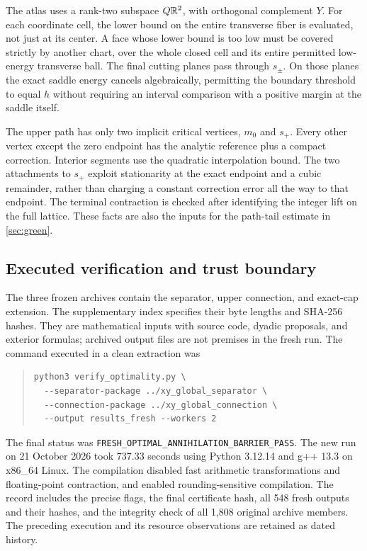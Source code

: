 The atlas uses a rank-two subspace $Q\mathbb R^2$, with orthogonal complement $Y$. For each coordinate cell, the lower bound on the entire transverse fiber is evaluated, not just at its center. A face whose lower bound is too low must be covered strictly by another chart, over the whole closed cell and its entire permitted low-energy transverse ball. The final cutting planes pass through $s_\pm$. On those planes the exact saddle energy cancels algebraically, permitting the boundary threshold to equal $h$ without requiring an interval comparison with a positive margin at the saddle itself.

The upper path has only two implicit critical vertices, $m_0$ and $s_+$. Every other vertex except the zero endpoint has the analytic reference plus a compact correction. Interior segments use the quadratic interpolation bound. The two attachments to $s_+$ exploit stationarity at the exact endpoint and a cubic remainder, rather than charging a constant correction error all the way to that endpoint. The terminal contraction is checked after identifying the integer lift on the full lattice. These facts are also the inputs for the path-tail estimate in \cref{sec:green}.

\subsection{Executed verification and trust boundary}

The three frozen archives contain the separator, upper connection, and exact-cap extension. The supplementary index specifies their byte lengths and SHA-256 hashes. They are mathematical inputs with source code, dyadic proposals, and exterior formulas; archived output files are not premises in the fresh run. The command executed in a clean extraction was
\begin{quote}\small
\begin{verbatim}
python3 verify_optimality.py \
  --separator-package ../xy_global_separator \
  --connection-package ../xy_global_connection \
  --output results_fresh --workers 2
\end{verbatim}
\end{quote}
The final status was \texttt{FRESH\_OPTIMAL\_ANNIHILATION\_BARRIER\_PASS}.
The new run on 21 October 2026 took 737.33 seconds using Python 3.12.14 and g++ 13.3 on x86\_64 Linux. The compilation disabled fast arithmetic transformations and floating-point contraction, and enabled rounding-sensitive compilation. The record includes the precise flags, the final certificate hash, all 548 fresh outputs and their hashes, and the integrity check of all 1,808 original archive members. The preceding execution and its resource observations are retained as dated history.

